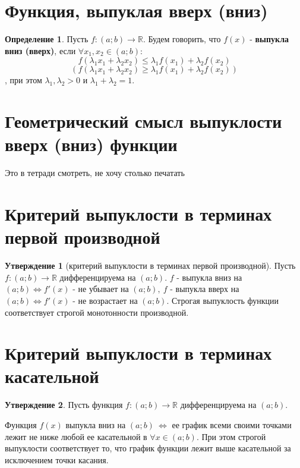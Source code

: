 \documentclass{report}
\theoremstyle{definition}
\newtheorem*{definition}{Определение}
\newtheorem*{statement}{Утверждение}
\begin{document}
\section{Функция, выпуклая вверх (вниз)}

\begin{definition}
    Пусть $f:(a;b) \rightarrow \mathbb{R}$. Будем говорить, что $f(x)$ - \textbf{выпукла вниз (вверх)},
    если $\forall x_1,x_2 \in (a;b)$:
    \begin{equation*}
        f(\lambda_1x_1 + \lambda_2x_2) \leqslant \lambda_1f(x_1) + \lambda_2f(x_2)
    \end{equation*}
    \begin{equation*}
        (f(\lambda_1x_1 + \lambda_2x_2) \geqslant \lambda_1f(x_1) + \lambda_2f(x_2))
    \end{equation*}, при этом $\lambda_1,\lambda_2 > 0$ и $\lambda_1 + \lambda_2 = 1$.
\end{definition}

\section{Геометрический смысл выпуклости вверх (вниз) функции}

Это в тетради смотреть, не хочу столько печатать

\section{Критерий выпуклости в терминах первой производной}

\begin{statement}[критерий выпуклости в терминах первой производной]
    Пусть $f:(a;b)\rightarrow\mathbb{R}$ дифференцируема на $(a;b)$. $f$ - выпукла вниз на $(a;b)
        \iff f'(x)$ - не убывает на $(a;b), \ f$ - выпукла вверх на $(a;b) \iff f'(x)$ - не возрастает
    на $(a;b)$. Строгая выпуклость функции соответствует строгой монотонности производной.
\end{statement}

\section{Критерий выпуклости в терминах касательной}

\begin{statement}
    Пусть функция $f:(a;b)\rightarrow\mathbb{R}$ дифференцируема на $(a;b)$.

    Функция $f(x)$ выпукла вниз на $(a;b) \ \iff$ ее график всеми своими точками лежит не ниже любой ее касательной в $\forall x \in (a;b)$. При этом строгой выпуклости соответствует то, что график функции лежит выше касательной за исключением точки касания. 
\end{statement}
\end{document}
